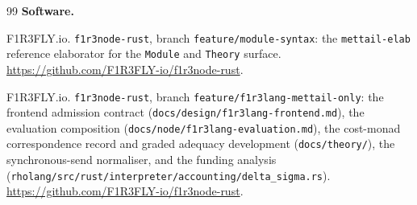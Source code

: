 \documentclass[11pt]{article}
\theoremstyle{branddef}
\theoremstyle{brandplain}
\theoremstyle{brandrem}
\begin{document}
\begin{thebibliography}{99}
\bigskip
\noindent\textbf{Software.}

F1R3FLY.io.
\newblock \texttt{f1r3node-rust}, branch \texttt{feature/module-syntax}: the
\texttt{mettail-elab} reference elaborator for the \texttt{Module} and
\texttt{Theory} surface.
\newblock \url{https://github.com/F1R3FLY-io/f1r3node-rust}.

F1R3FLY.io.
\newblock \texttt{f1r3node-rust}, branch \texttt{feature/f1r3lang-mettail-only}:
the frontend admission contract (\texttt{docs/design/f1r3lang-frontend.md}),
the evaluation composition (\texttt{docs/node/f1r3lang-evaluation.md}), the
cost-monad correspondence record and graded adequacy development
(\texttt{docs/theory/}), the synchronous-send normaliser, and the funding
analysis (\texttt{rholang/src/rust/interpreter/accounting/delta\_sigma.rs}).
\newblock \url{https://github.com/F1R3FLY-io/f1r3node-rust}.

\end{thebibliography}
\end{document}
